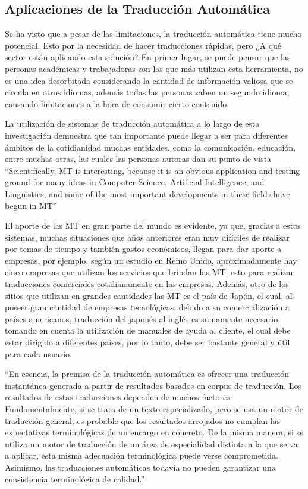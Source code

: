 \documentclass[conference]{IEEEtran}
\begin{document}
\subsection{Aplicaciones de la Traducción Automática}

Se ha visto que a pesar de las limitaciones, la traducción automática tiene mucho potencial. Esto por la necesidad de hacer traducciones rápidas, pero ¿A qué sector están aplicando esta solución? En primer lugar, se puede pensar que las personas académicas y trabajadoras son las que más utilizan esta herramienta, no es una idea desorbitada considerando la cantidad de información valiosa que se circula en otros idiomas, además todas las personas saben un segundo idioma, causando limitaciones a la hora de consumir cierto contenido.

La utilización de sistemas de traducción automática a lo largo de esta investigación demuestra que tan importante puede llegar a ser para diferentes ámbitos de la cotidianidad muchas entidades, como la comunicación, educación, entre muchas otras, las cuales las personas autoras dan su punto de vista “Scientifically, MT is interesting, because it is an obvious application and testing ground for many ideas in Computer Science, Artificial Intelligence, and Linguistics, and some of the most important developments in these fields have begun in MT”\cite{b1}

El aporte de las MT en gran parte del mundo es evidente, ya que, gracias a estos sistemas, muchas situaciones que años anteriores eran muy difíciles de realizar por temas de tiempo y también gastos económicos, llegan para dar aporte a empresas, por ejemplo, según un estudio en Reino Unido, aproximadamente hay cinco empresas que utilizan los servicios que brindan las MT, esto para realizar traducciones comerciales cotidianamente en las empresas. Además, otro de los sitios que utilizan en grandes cantidades las MT es el país de Japón, el cual, al poseer gran cantidad de empresas tecnológicas, debido a su comercialización a países americanos, traducción del japonés al inglés es sumamente necesario, tomando en cuenta la utilización de manuales de ayuda al cliente, el cual debe estar dirigido a diferentes países, por lo tanto, debe ser bastante general y útil para cada usuario.

	“En esencia, la premisa de la traducción automática es ofrecer una traducción instantánea generada a partir de resultados basados en corpus de traducción. Los resultados de estas traducciones dependen de muchos factores. Fundamentalmente, si se trata de un texto especializado, pero se usa un motor de traducción general, es probable que los resultados arrojados no cumplan las expectativas terminológicas de un encargo en concreto. De la misma manera, si se utiliza un motor de traducción de un área de especialidad distinta a la que se va a aplicar, esta misma adecuación terminológica puede verse comprometida. Asimismo, las traducciones automáticas todavía no pueden garantizar una consistencia terminológica de calidad.”\cite{b11}
 
\end{document}

